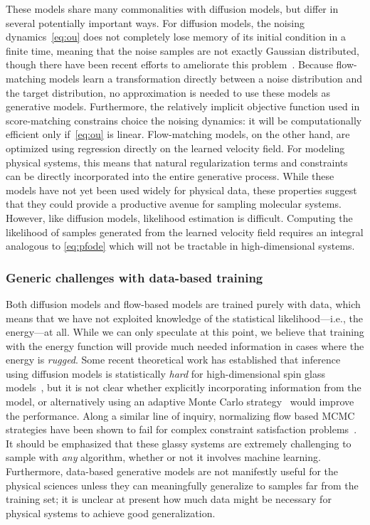 \documentclass[11pt]{article}
\begin{document}
These models share many commonalities with diffusion models, but differ in several potentially important ways.
For diffusion models, the noising dynamics~\eqref{eq:ou} does not completely lose memory of its initial condition in a finite time, meaning that the noise samples are not exactly Gaussian distributed, though there have been recent efforts to ameliorate this problem~\cite{shi_diffusion_2023}.
Because flow-matching models learn a transformation directly between a noise distribution and the target distribution, no approximation is needed to use these models as generative models. 
Furthermore, the relatively implicit objective function used in score-matching constrains choice the noising dynamics: it will be computationally efficient only if~\eqref{eq:ou} is linear.
Flow-matching models, on the other hand, are optimized using regression directly on the learned velocity field. 
For modeling physical systems, this means that natural regularization terms and constraints can be directly incorporated into the entire generative process. 
While these models have not yet been used widely for physical data, these properties suggest that they could provide a productive avenue for sampling molecular systems. 
However, like diffusion models, likelihood estimation is difficult. 
Computing the likelihood of samples generated from the learned velocity field requires an integral analogous to \eqref{eq:pfode} which will not be tractable in high-dimensional systems.


\subsubsection{Generic challenges with data-based training}\label{sec:databased}

Both diffusion models and flow-based models are trained purely with data, which means that we have not exploited knowledge of the statistical likelihood---i.e., the energy---at all. 
While we can only speculate at this point, we believe that training with the energy function will provide much needed information in cases where the energy is \emph{rugged}.
Some recent theoretical work has established that inference using diffusion models is statistically \emph{hard} for high-dimensional spin glass models~\cite{ghio_sampling_2023}, but it is not clear whether explicitly incorporating information from the model, or alternatively using an adaptive Monte Carlo strategy~\cite{gabrie_efficient_2021, gabrie_adaptive_2022} would improve the performance.
Along a similar line of inquiry, normalizing flow based MCMC strategies have been shown to fail for complex constraint satisfaction problems~\cite{ciarella_machine-learning-assisted_2023}.
It should be emphasized that these glassy systems are extremely challenging to sample with \emph{any} algorithm, whether or not it involves machine learning.
Furthermore, data-based generative models are not manifestly useful for the physical sciences unless they can meaningfully generalize to samples far from the training set; it is unclear at present how much data might be necessary for physical systems to achieve good generalization.
\end{document}
